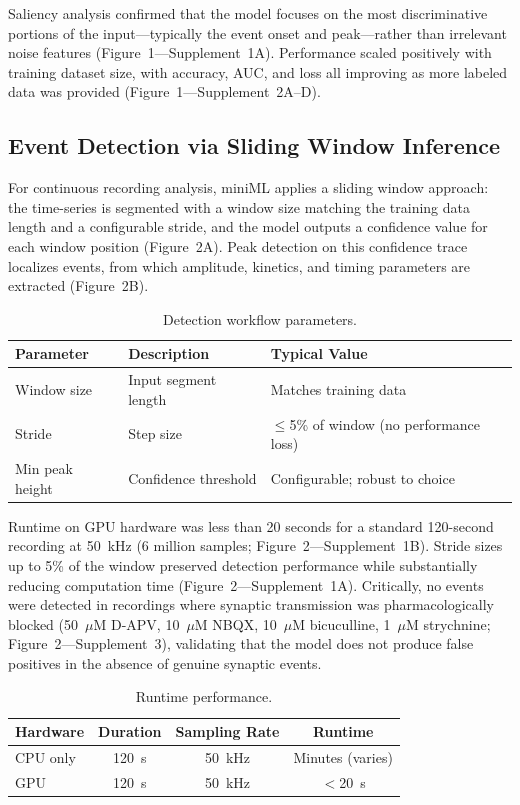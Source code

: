 \documentclass[11pt]{article}
\begin{document}
Saliency analysis confirmed that the model focuses on the most discriminative portions of the input---typically the event onset and peak---rather than irrelevant noise features (Figure~1---Supplement~1A). Performance scaled positively with training dataset size, with accuracy, AUC, and loss all improving as more labeled data was provided (Figure~1---Supplement~2A--D).

\subsection{Event Detection via Sliding Window Inference}

For continuous recording analysis, miniML applies a sliding window approach: the time-series is segmented with a window size matching the training data length and a configurable stride, and the model outputs a confidence value for each window position (Figure~2A). Peak detection on this confidence trace localizes events, from which amplitude, kinetics, and timing parameters are extracted (Figure~2B).

\begin{table}[H]
\centering
\caption{Detection workflow parameters.}
\label{tab:workflow}
\begin{tabular}{lll}
\toprule
Parameter & Description & Typical Value \\
\midrule
Window size & Input segment length & Matches training data \\
Stride & Step size & $\leq$5\% of window (no performance loss) \\
Min peak height & Confidence threshold & Configurable; robust to choice \\
\bottomrule
\end{tabular}
\end{table}

Runtime on GPU hardware was less than 20 seconds for a standard 120-second recording at 50~kHz (6 million samples; Figure~2---Supplement~1B). Stride sizes up to 5\% of the window preserved detection performance while substantially reducing computation time (Figure~2---Supplement~1A). Critically, no events were detected in recordings where synaptic transmission was pharmacologically blocked (50~$\mu$M D-APV, 10~$\mu$M NBQX, 10~$\mu$M bicuculline, 1~$\mu$M strychnine; Figure~2---Supplement~3), validating that the model does not produce false positives in the absence of genuine synaptic events.

\begin{table}[H]
\centering
\caption{Runtime performance.}
\label{tab:runtime}
\begin{tabular}{lccc}
\toprule
Hardware & Duration & Sampling Rate & Runtime \\
\midrule
CPU only & 120~s & 50~kHz & Minutes (varies) \\
GPU & 120~s & 50~kHz & $<$20~s \\
\bottomrule
\end{tabular}
\end{table}
\end{document}
